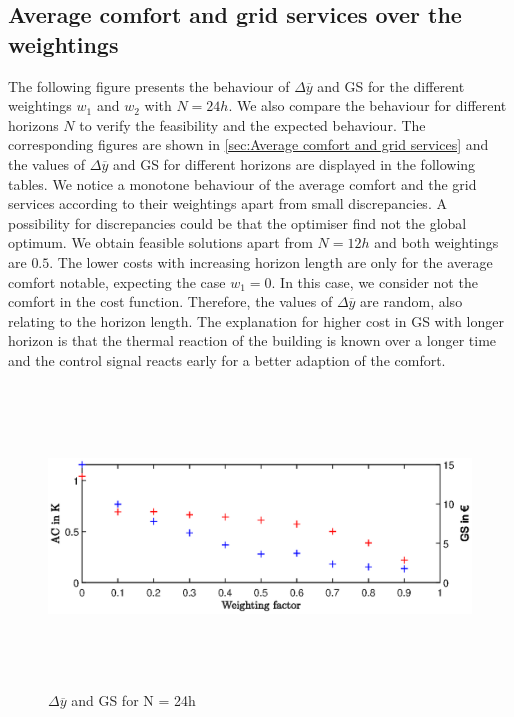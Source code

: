 \subsection{Average comfort and grid services over the weightings}
\label{subsec:Average comfort and grid services over the weightings}
The following figure presents the behaviour of $\Delta \overline{y}$ and GS for the different weightings $w_\text{1}$ and $w_\text{2}$ with $N = 24h$. We also compare the behaviour for different horizons $N$ to verify the feasibility and the expected behaviour. The corresponding figures are shown in \autoref{sec:Average comfort and grid services} and the values of $\Delta \overline{y}$ and GS for different horizons are displayed in the following tables.\newline
We notice a monotone behaviour of the average comfort and the grid services according to their weightings apart from small discrepancies. A possibility for discrepancies could be that the optimiser find not the global optimum. We obtain feasible solutions apart from $N=12 h$ and both weightings are $0.5$. The lower costs with increasing horizon length are only for the average comfort notable, expecting the case $w_\text{1}=0$. In this case, we consider not the comfort in the cost function. Therefore, the values of $\Delta \overline{y}$ are random, also relating to the horizon length.\newline
The explanation for higher cost in GS with longer horizon is that the thermal reaction of the building is known over a longer time and the control signal reacts early for a better adaption of the comfort.
    \begin{figure}[h]
            \centering
            \includegraphics[width=15cm,height=8cm]{figure/AC_und_GS_24h.eps}
           \caption{$\Delta \overline{y}$ and GS for N = 24h}
            \label{fig:AC_und_GS_24h}
    \end{figure}
    
